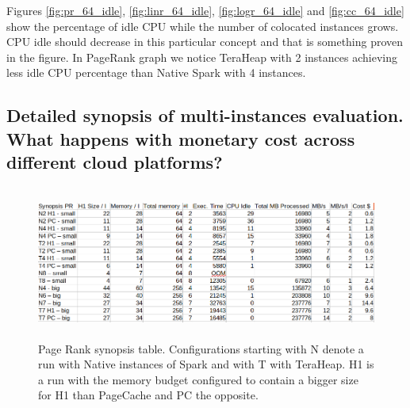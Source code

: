 Figures \ref{fig:pr_64_idle}, \ref{fig:linr_64_idle},
\ref{fig:logr_64_idle} and \ref{fig:cc_64_idle}  show the percentage
of idle CPU while the number of colocated instances grows. CPU idle
should decrease in this particular concept and that is something
proven in the figure. In PageRank graph we notice TeraHeap with 2
instances achieving less idle CPU percentage than Native Spark with 4
instances.

\subsection{Detailed synopsis of multi-instances evaluation. What
happens with monetary cost across different cloud platforms?}

\begin{figure}[t!]
        \includegraphics[width=18cm,height=5cm]{./fig/pr_table.png}
    \caption{Page Rank synopsis table. Configurations starting with N
    denote a run with Native instances of Spark and with T with
    TeraHeap. H1 is a run with the memory budget configured to contain
    a bigger size for H1 than PageCache and PC the opposite.}
	\label{fig:pr_table}
\end{figure}

